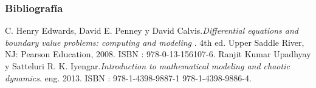 \documentclass{beamer}
\begin{document}
\begin{frame}
	\frametitle{Bibliograf\'ia}
	\begin{thebibliography}{99}
		
		  C. Henry Edwards, David E. Penney y David Calvis.\hspace{0.1cm}\textit{Differential equations and boundary value
			problems: computing and modeling} . 4th ed. Upper Saddle River, NJ: Pearson Education, 2008.
		ISBN : 978-0-13-156107-6.
		 Ranjit Kumar Upadhyay y Satteluri R. K. Iyengar.\hspace{0.1cm}\textit {Introduction to mathematical modeling and chaotic dynamics}. eng. 2013. ISBN : 978-1-4398-9887-1 978-1-4398-9886-4.
	
	\end{thebibliography}
\end{frame}
\end{document}
